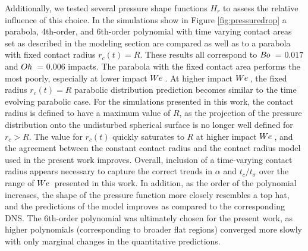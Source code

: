 \documentclass{jfm}
\begin{document}
 \hspace*{1em} Additionally, we tested several pressure shape functions $H_r$ to assess the relative influence of this choice. In the simulations show in Figure \ref{fig:pressuredrop} a parabola, 4th-order, and 6th-order polynomial with time varying contact areas set as described in the modeling section are compared as well as to a parabola with fixed contact radius $r_c(t) = R$. These results all correspond to $B\kern-0.04em o\,$ = $0.017$ and $O\kern-0.04em h\,$ = $0.006$ impacts. The parabola with the fixed contact area performs the most poorly, especially at lower impact $W\kern-0.03em e\,$. At higher impact $W\kern-0.03em e\,$, the fixed radius $r_c(t)=R$ parabolic distribution prediction becomes similar to the time evolving parabolic case. For the simulations presented in this work, the contact radius is defined to have a maximum value of $R$, as the projection of the pressure distribution onto the undisturbed spherical surface is no longer well defined for $r_c > R$. The value for $r_c(t)$ quickly saturates to $R$ at higher impact $W\kern-0.03em e\,$, and the agreement between the constant contact radius and the contact radius model used in the present work improves.  Overall, inclusion of a time-varying contact radius appears necessary to capture the correct trends in $\alpha$ and $t_c/t_{\sigma}$ over the range of $W\kern-0.03em e\,$ presented in this work. In addition, as the order of the polynomial increases, the shape of the pressure function more closely resembles a top hat, and the predictions of the model improves as compared to the corresponding DNS. The 6th-order polynomial was ultimately chosen for the present work, as higher polynomials (corresponding to broader flat regions) converged more slowly with only marginal changes in the quantitative predictions.

\newpage


\end{document}
